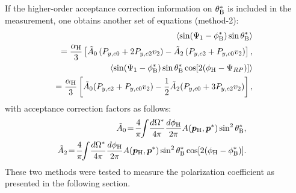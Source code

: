 \documentclass[preprint,5p,times,twocolumn]{elsarticle}
\begin{document}
If the higher-order acceptance correction information on $\theta^{\ast}_{\rm B}$ is included in the measurement, one obtains another set of equations (method-2):
%
\begin{eqnarray}
& & \hspace{-35pt} \langle \sin(\Psi_1-\phi_{\rm B}^{\ast})\sin\theta_{\rm B}^{\ast}\rangle \nonumber \\
& & \hspace{-15pt} = \dfrac{\alpha_{\rm H}}{3}\left[\tilde{A}_{0}\left(P_{y,c0}+2P_{y,c2}v_{2}\right)-\tilde{A}_{2}\left(P_{y,c2}+P_{y,c0}v_{2}\right)\right], \label{eq:Pyc0tl}\\
& & \hspace{-35pt} \langle \sin(\Psi_1-\phi_{\rm B}^{\ast})\sin\theta_{\rm B}^{\ast}\cos[2(\phi_{\rm H}-\Psi_{RP})]\rangle \nonumber \\
& & \hspace{-15pt} = \dfrac{\alpha_{\rm H}}{3}\left[\tilde{A}_{0}(P_{y,c2}+P_{y,c0}v_{2})-\dfrac{1}{2}\tilde{A}_{2}(P_{y,c0}+3P_{y,c2}v_{2})\right] \label{eq:Pyc2tl},
\end{eqnarray}
with acceptance correction factors as follows:
\begin{eqnarray}
&&\hspace{-20pt} \tilde{A}_{0} \!=\! \dfrac{4}{\pi} \!\!\int\! \dfrac{d\Omega^{\ast}}{4\pi} \dfrac{d\phi_{\rm H}}{2\pi} A(\boldsymbol{p}_{\rm H}, \boldsymbol{p}^{\ast})\sin^2\theta_{\rm B}^{\ast}, \\
%
&&\hspace{-20pt} \tilde{A}_{2} \!=\! \dfrac{4}{\pi} \!\!\int\! \dfrac{d\Omega^{\ast}}{4\pi} \dfrac{d\phi_{\rm H}}{2\pi} A(\boldsymbol{p}_{\rm H},\boldsymbol{p}^{\ast})\sin^2\theta_{\rm B}^{\ast}\cos[2(\phi_{\rm H}-\phi_{\rm B}^{\ast})].
\end{eqnarray}
These two methods were tested to measure the polarization coefficient as presented in the following section.
\end{document}
